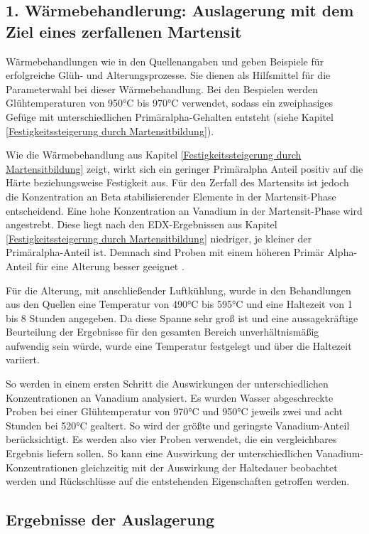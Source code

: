 \documentclass[a4paper, 11pt]{tubsreprt}
\begin{document}
\subsection{1. Wärmebehandlerung: Auslagerung mit dem Ziel eines zerfallenen Martensit}
Wärmebehandlungen wie in den Quellenangaben \cite{Gilbert2004} und \cite{Chen2008} geben Beispiele für erfolgreiche Glüh- und Alterungsprozesse. Sie dienen als Hilfsmittel für die Parameterwahl bei dieser Wärmebehandlung. Bei den Bespielen werden Glühtemperaturen von 950°C bis 970°C verwendet, sodass ein zweiphasiges Gefüge mit unterschiedlichen Primäralpha-Gehalten entsteht (siehe Kapitel \ref{Festigkeitssteigerung durch Martensitbildung}). 

Wie die Wärmebehandlung aus Kapitel \ref{Festigkeitssteigerung durch Martensitbildung} zeigt, wirkt sich ein geringer Primäralpha Anteil positiv auf die Härte beziehungsweise Festigkeit aus. Für den Zerfall des Martensits ist jedoch die Konzentration an Beta stabilisierender Elemente in der Martensit-Phase entscheidend. Eine hohe Konzentration an Vanadium in der Martensit-Phase wird angestrebt. Diese liegt nach den EDX-Ergebnissen aus Kapitel \ref{Festigkeitssteigerung durch Martensitbildung} niedriger, je kleiner der Primäralpha-Anteil ist. Demnach sind Proben mit einem höheren Primär Alpha-Anteil für eine Alterung besser geeignet \cite{Luetjering2007}.

Für die Alterung, mit anschließender Luftkühlung, wurde in den Behandlungen aus den Quellen eine Temperatur von 490°C bis 595°C und eine Haltezeit von 1 bis 8 Stunden angegeben. Da diese Spanne sehr groß ist und eine aussagekräftige Beurteilung der Ergebnisse für den gesamten Bereich unverhältnismäßig aufwendig sein würde, wurde eine Temperatur festgelegt und über die Haltezeit variiert.

So werden in einem ersten Schritt die Auswirkungen der unterschiedlichen Konzentrationen an Vanadium analysiert. Es wurden Wasser abgeschreckte Proben bei einer Glühtemperatur von 970°C und 950°C jeweils zwei und acht Stunden bei 520°C gealtert. So wird der größte und geringste Vanadium-Anteil berücksichtigt. Es werden also vier Proben verwendet, die ein vergleichbares Ergebnis liefern sollen. So kann eine Auswirkung der unterschiedlichen Vanadium-Konzentrationen gleichzeitig mit der Auswirkung der Haltedauer beobachtet werden und Rückschlüsse auf die entstehenden Eigenschaften getroffen werden.
\subsection{Ergebnisse der Auslagerung}
\end{document}

